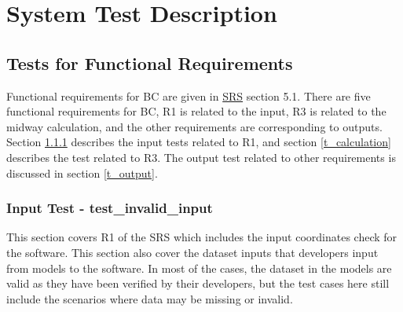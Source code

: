 \documentclass[12pt, titlepage]{article}
\begin{document}




\section{System Test Description}\label{STD}
\subsection{Tests for Functional Requirements}
Functional requirements for BC are given in \href{https://github.com/CynthiaLiu0805/BridgeCorrosion/blob/main/docs/SRS/SRS.pdf}{SRS} section 5.1. There are five functional requirements for BC, R1 is related to the input, R3 is related to the midway calculation, and the other requirements are corresponding to outputs. Section \ref{t_input} describes the input tests related to R1, and section \ref{t_calculation} describes the test related to R3. The output test related to other requirements is discussed in section \ref{t_output}.
\\



\subsubsection{Input Test - test\_invalid\_input}\label{t_input}
This section covers R1 of the SRS which includes the input coordinates check for the software. This section also cover the dataset inputs that developers input from models to the software. In most of the cases, the dataset in the models are valid as they have been verified by their developers, but the test cases here still include the scenarios where data may be missing or invalid.
\end{document}
